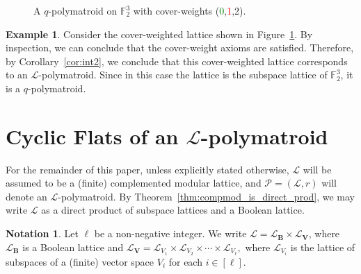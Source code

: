 \documentclass[a4paper,11pt,reqno]{article}
\theoremstyle{definition}
\newtheorem{example}[theorem]{{{Example}}}
\newtheorem{notation}[theorem]{{{Notation}}}
\newcommand{\mL}{\mathcal{L}}
\newcommand{\mP}{\mathcal{P}}
\begin{document}
\begin{figure}
{}
    \caption{A $q$-polymatroid on $\mathbb{F}_2^3$ with cover-weights (\textcolor{green}{0},\textcolor{red}{1},2).}
    \label{fig:running_eg}
\end{figure}

\begin{example}
    Consider the cover-weighted lattice shown in Figure~\ref{fig:running_eg}. By inspection, we can conclude that the cover-weight axioms are satisfied. Therefore, by Corollary~\ref{cor:int2}, we conclude that this cover-weighted lattice corresponds to an $\mathcal{L}$-polymatroid. Since in this case the lattice is the subspace lattice of $\mathbb{F}_2^3$, it is a $q$-polymatroid.
\end{example}


\section{Cyclic Flats of an \texorpdfstring{$\mathcal{L}$}{L}-polymatroid}\label{sec:cyclicflat}
For the remainder of this paper, unless explicitly stated otherwise, $\mL$ will be assumed to be a (finite) complemented modular lattice, and $\mP=(\mathcal{L},r)$ will denote an $\mL$-polymatroid. By Theorem~\ref{thm:compmod_is_direct_prod}, we may write $\mathcal{L}$ as a direct product of subspace lattices and a Boolean lattice. 
\begin{notation}
    Let $\ell$ be a non-negative integer. We write $\mathcal{L}=\mathcal{L}_\mathbf{B}\times\mathcal{L}_\mathbf{V}$, where $\mathcal{L}_\mathbf{B}$ is a Boolean lattice and
    $\mathcal{L}_\mathbf{V}=\mathcal{L}_{V_1}\times\mathcal{L}_{V_2}\times\cdots\times\mathcal{L}_{V_\ell},$
  where $\mathcal{L}_{V_i}$ is the lattice of subspaces of a (finite) vector space $V_i$ for each $i\in[\ell]$.
\end{notation}
\end{document}
